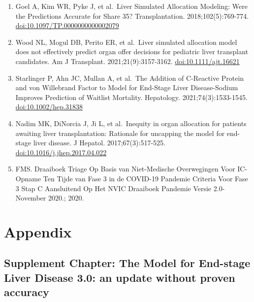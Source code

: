 \documentclass[11pt,english,]{book} %
\begin{document}
\begin{enumerate}
\item
  Goel A, Kim WR, Pyke J, et al.~Liver Simulated Allocation Modeling: Were the Predictions Accurate for Share 35? Transplantation. 2018;102(5):769-774. \url{doi:10.1097/TP.0000000000002079}
\item
  Wood NL, Mogul DB, Perito ER, et al.~Liver simulated allocation model does not effectively predict organ offer decisions for pediatric liver transplant candidates. Am J Transplant. 2021;21(9):3157-3162. \url{doi:10.1111/ajt.16621}
\item
  Starlinger P, Ahn JC, Mullan A, et al.~The Addition of C-Reactive Protein and von Willebrand Factor to Model for End-Stage Liver Disease-Sodium Improves Prediction of Waitlist Mortality. Hepatology. 2021;74(3):1533-1545. \url{doi:10.1002/hep.31838}
\item
  Nadim MK, DiNorcia J, Ji L, et al.~Inequity in organ allocation for patients awaiting liver transplantation: Rationale for uncapping the model for end-stage liver disease. J Hepatol. 2017;67(3):517-525. \url{doi:10.1016/j.jhep.2017.04.022}
\item
  FMS. Draaiboek Triage Op Basis van Niet-Medische Overwegingen Voor IC-Opname Ten Tijde van Fase 3 in de COVID-19 Pandemie Criteria Voor Fase 3 Stap C Aansluitend Op Het NVIC Draaiboek Pandemie Versie 2.0-November 2020.; 2020.
\end{enumerate}

\newpage
\linespread{1.213}
\normalsize
\thispagestyle{plain}

\mbox{}


\pagecolor{black}
\color{white}

\hypertarget{appendix}{%
\chapter{Appendix}\label{appendix}}

\newpage
\nopagecolor
\color{black}

\hypertarget{chap-meld3}{%
\section{Supplement Chapter: The Model for End-stage Liver Disease 3.0: an update without proven accuracy}\label{chap-meld3}}


\vspace*{\fill}
\end{document}
